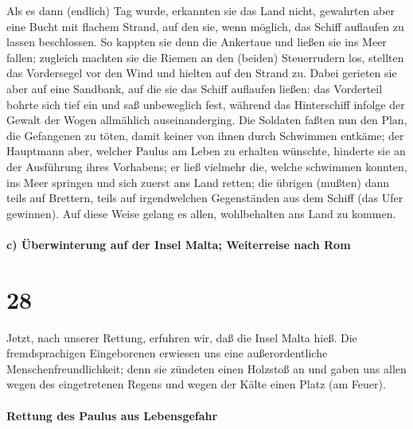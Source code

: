  Als es dann (endlich) Tag wurde, erkannten sie das Land
nicht, gewahrten aber eine Bucht mit flachem Strand, auf den sie, wenn
möglich, das Schiff auflaufen zu lassen beschlossen.  So
kappten sie denn die Ankertaue und ließen sie ins Meer fallen; zugleich
machten sie die Riemen an den (beiden) Steuerrudern los, stellten das
Vordersegel vor den Wind und hielten auf den Strand zu. 
Dabei gerieten sie aber auf eine Sandbank, auf die sie das Schiff
auflaufen ließen: das Vorderteil bohrte sich tief ein und saß
unbeweglich fest, während das Hinterschiff infolge der Gewalt der Wogen
allmählich auseinanderging.  Die Soldaten faßten nun den
Plan, die Gefangenen zu töten, damit keiner von ihnen durch Schwimmen
entkäme;  der Hauptmann aber, welcher Paulus am Leben zu
erhalten wünschte, hinderte sie an der Ausführung ihres Vorhabens; er
ließ vielmehr die, welche schwimmen konnten, ins Meer springen und sich
zuerst ans Land retten;  die übrigen (mußten) dann teils
auf Brettern, teils auf irgendwelchen Gegenständen aus dem Schiff (das
Ufer gewinnen). Auf diese Weise gelang es allen, wohlbehalten ans Land
zu kommen.

\hypertarget{c-uxfcberwinterung-auf-der-insel-malta-weiterreise-nach-rom}{%
\paragraph{c) Überwinterung auf der Insel Malta; Weiterreise nach
Rom}\label{c-uxfcberwinterung-auf-der-insel-malta-weiterreise-nach-rom}}

\hypertarget{section-27}{%
\section{28}\label{section-27}}

 Jetzt, nach unserer Rettung, erfuhren wir, daß die Insel
Malta hieß.  Die fremdsprachigen Eingeborenen erwiesen uns
eine außerordentliche Menschenfreundlichkeit; denn sie zündeten einen
Holzstoß an und gaben uns allen wegen des eingetretenen Regens und wegen
der Kälte einen Platz (am Feuer).

\hypertarget{rettung-des-paulus-aus-lebensgefahr}{%
\paragraph{Rettung des Paulus aus
Lebensgefahr}\label{rettung-des-paulus-aus-lebensgefahr}}

